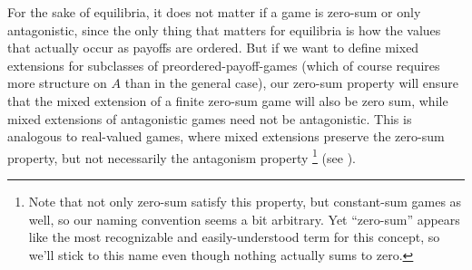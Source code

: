 \documentclass[a4paper]{scrreprt}
\begin{document}
    For the sake of equilibria, it does not matter if a game is zero-sum or only antagonistic, since the only thing that matters for equilibria is how the values that actually occur as payoffs are ordered.
    But if we want to define mixed extensions for subclasses of preordered-payoff-games (which of course requires more structure on $A$ than in the general case), our zero-sum property will ensure that the mixed extension of a finite zero-sum game will also be zero sum, while mixed extensions of antagonistic games need not be antagonistic. This is analogous to real-valued games, where mixed extensions preserve the zero-sum property, but not necessarily the antagonism property
    \footnote{Note that not only zero-sum satisfy this property, but constant-sum games as well, so our naming convention seems a bit arbitrary.
        Yet “zero-sum” appears like the most recognizable and easily-understood term for this concept, so we'll stick to this name even though nothing actually sums to zero.}
    (see \cite{bib:andersonAntagonisticGames}).
    
\end{document}
